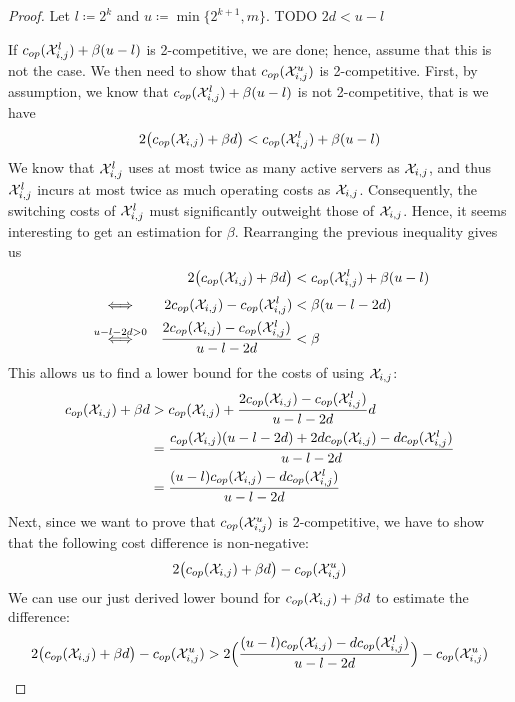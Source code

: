 \begin{proof}
Let $l\coloneqq 2^k$ and $u\coloneqq\min\{2^{k+1},m\}$. TODO $2d<u-l$

If $c_{op}(\mathcal{X}_{i,j}^l)+\beta(u-l)$ is 2-competitive, we are done; hence, assume that this is not the case. We then need to show that $c_{op}(\mathcal{X}_{i,j}^u)$ is 2-competitive. First, by assumption, we know that $c_{op}(\mathcal{X}_{i,j}^l)+\beta(u-l)$ is not 2-competitive, that is we have
\begin{equation*}
	2\bigl(c_{op}(\mathcal{X}_{i,j})+\beta d\bigr)<c_{op}(\mathcal{X}_{i,j}^l)+\beta(u-l)
\end{equation*}
We know that $\mathcal{X}_{i,j}^l$ uses at most twice as many active servers as $\mathcal{X}_{i,j}$, and thus $\mathcal{X}_{i,j}^l$ incurs at most twice as much operating costs as $\mathcal{X}_{i,j}$. Consequently, the switching costs of $\mathcal{X}_{i,j}^l$ must significantly outweight those of $\mathcal{X}_{i,j}$. Hence, it seems interesting to get an estimation for $\beta$. Rearranging the previous inequality gives us
\begin{align*}
	&&2\bigl(c_{op}(\mathcal{X}_{i,j})+\beta d\bigr)&<c_{op}(\mathcal{X}_{i,j}^l)+\beta(u-l)\\
	&\stackrel{\phantom{u-l-2d>0}}{\iff}&2c_{op}(\mathcal{X}_{i,j})-c_{op}(\mathcal{X}_{i,j}^l)&<\beta(u-l-2d)\\
	&\stackrel{u-l-2d>0}{\iff}&\frac{2c_{op}(\mathcal{X}_{i,j})-c_{op}(\mathcal{X}_{i,j}^l)}{u-l-2d}&<\beta
\end{align*}
This allows us to find a lower bound for the costs of using $\mathcal{X}_{i,j}$:
\begin{align*}
	c_{op}(\mathcal{X}_{i,j})+\beta d&>c_{op}(\mathcal{X}_{i,j})+\frac{2c_{op}(\mathcal{X}_{i,j})-c_{op}(\mathcal{X}_{i,j}^l)}{u-l-2d}d\\
	&=\frac{c_{op}(\mathcal{X}_{i,j})(u-l-2d)+2dc_{op}(\mathcal{X}_{i,j})-dc_{op}(\mathcal{X}_{i,j}^l)}{u-l-2d}\\
	&=\frac{(u-l)c_{op}(\mathcal{X}_{i,j})-dc_{op}(\mathcal{X}_{i,j}^l)}{u-l-2d}
\end{align*}
Next, since we want to prove that $c_{op}(\mathcal{X}_{i,j}^u)$ is 2-competitive, we have to show that the following cost difference is non-negative:
\begin{align*}
	2\bigl(c_{op}(\mathcal{X}_{i,j})+\beta d\bigr)-c_{op}(\mathcal{X}_{i,j}^u)
\end{align*}
We can use our just derived lower bound for $c_{op}(\mathcal{X}_{i,j})+\beta d$ to estimate the difference:
\begin{align*}
	2\bigl(\opcosts(\mx_{i,j})+\beta d\bigr)-\opcosts(\mx_{i,j}^u)&>2\Bigl(\frac{(u-l)\opcosts(\mx_{i,j})-d\opcosts(\mx_{i,j}^l)}{u-l-2d}\Bigr)-\opcosts(\mx_{i,j}^u)\\

\end{align*}
\end{proof}
